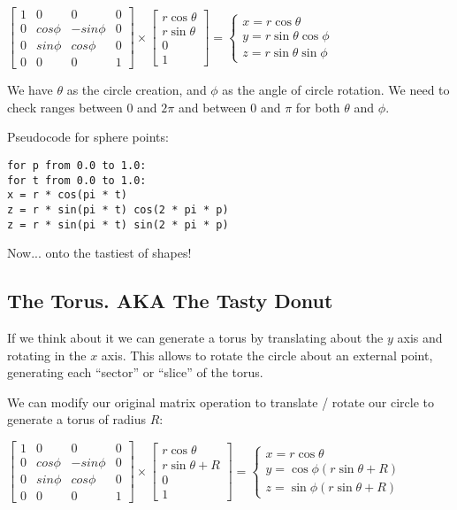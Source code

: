 \documentclass[11pt,fleqn]{article}
\theoremstyle{definition}
\begin{document}
$
\begin{bmatrix}
    1 & 0 & 0 & 0 \\
    0 & cos\phi & -sin\phi & 0 \\
    0 & sin\phi & cos\phi & 0 \\
    0 & 0 & 0 & 1
\end{bmatrix} \times
\begin{bmatrix}
    r\cos\theta \\
    r\sin\theta \\
    0 \\
    1
\end{bmatrix} =
\begin{cases}
    x = r\cos\theta \\
    y = r\sin\theta\cos\phi \\
    z = r\sin\theta\sin\phi
\end{cases}
$

We have $\theta$ as the circle creation, and $\phi$ as the angle of circle rotation.
We need to check ranges between 0 and $2\pi$ and between 0 and $\pi$ for both
$\theta$ and $\phi$.

Pseudocode for sphere points:

\begin{verbatim}
for p from 0.0 to 1.0:
for t from 0.0 to 1.0:
x = r * cos(pi * t)
z = r * sin(pi * t) cos(2 * pi * p)
z = r * sin(pi * t) sin(2 * pi * p)
\end{verbatim}

Now... onto the tastiest of shapes!

\subsection{The Torus. AKA The Tasty Donut}

If we think about it we can generate a torus by translating about the $y$ axis and
rotating in the $x$ axis. This allows to rotate the circle about an external point,
generating each ``sector'' or ``slice'' of the torus.

We can modify our original matrix operation to translate / rotate our circle to
generate a torus of radius $R$:

$
\begin{bmatrix}
    1 & 0 & 0 & 0 \\
    0 & cos\phi & -sin\phi & 0 \\
    0 & sin\phi & cos\phi & 0 \\
    0 & 0 & 0 & 1
\end{bmatrix} \times
\begin{bmatrix}
    r\cos\theta \\
    r\sin\theta + R \\
    0 \\
    1
\end{bmatrix} =
\begin{cases}
    x = r\cos\theta \\
    y = \cos\phi(r\sin\theta + R) \\
    z = \sin\phi(r\sin\theta + R)
\end{cases}
$
\end{document}
